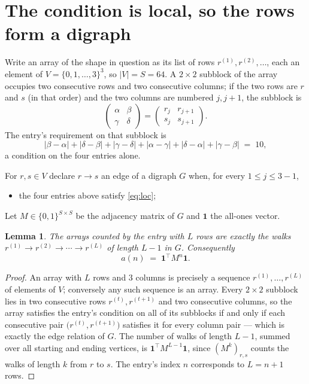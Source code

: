 \documentclass[11pt,a4paper]{article}
\theoremstyle{plain}
\newtheorem{lemma}[theorem]{Lemma}
\theoremstyle{definition}
\begin{document}
\section{The condition is local, so the rows form a digraph}

Write an array of the shape in question as its list of rows
$r^{(1)},r^{(2)},\dots$, each an element of
$V=\{0,1,\dots,3\}^{3}$, so $|V|=S=64$. A $2\times2$ subblock of the array
occupies two consecutive rows and two consecutive columns; if the two rows are $r$
and $s$ (in that order) and the two columns are numbered $j,j+1$,
the subblock is
\[
\begin{pmatrix}\alpha&\beta\\\gamma&\delta\end{pmatrix}=\begin{pmatrix}r_j&r_{j+1}\\s_j&s_{j+1}\end{pmatrix}.
\]
The entry's requirement on that subblock is
\begin{equation}\label{eq:loc}
|\beta-\alpha|+|\delta-\beta|+|\gamma-\delta|+|\alpha-\gamma|+|\delta-\alpha|+|\gamma-\beta|\;=\;10,
\end{equation}
a condition on the four entries alone.

For $r,s\in V$ declare $r\to s$ an edge of a digraph $G$ when, for every
$1\le j\le 3-1$,
\begin{itemize}
\item the four entries above satisfy \eqref{eq:loc};

\end{itemize}
Let $M\in\{0,1\}^{S\times S}$ be the adjacency matrix of $G$ and $\mathbf{1}$ the
all-ones vector.

\begin{lemma}\label{lem:walk}
The arrays counted by the entry with $L$ rows are exactly the walks
$r^{(1)}\to r^{(2)}\to\cdots\to r^{(L)}$ of length $L-1$ in $G$. Consequently
\[
a(n)\;=\;\mathbf{1}^{\!\top}M^{n}\mathbf{1} .
\]
\end{lemma}

\begin{proof}
An array with $L$ rows and $3$ columns is precisely a sequence
$r^{(1)},\dots,r^{(L)}$ of elements of $V$; conversely any such sequence is an array.
Every $2\times2$ subblock lies in two consecutive rows $r^{(t)},r^{(t+1)}$ and two
consecutive columns, so the array satisfies the entry's condition on all of its subblocks
if and only if each consecutive pair $\bigl(r^{(t)},r^{(t+1)}\bigr)$ satisfies it for
every column pair --- which is exactly the edge relation of $G$. The number of walks of
length $L-1$, summed over all starting and ending vertices, is
$\mathbf{1}^{\!\top}M^{L-1}\mathbf{1}$, since $(M^{k})_{r,s}$ counts the walks of
length $k$ from $r$ to $s$. The entry's index $n$ corresponds to $L=n+1$ rows.
\end{proof}
\end{document}
